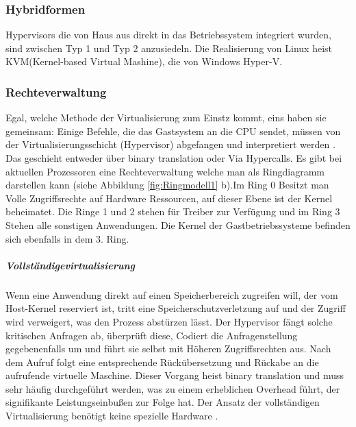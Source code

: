 \subsubsection{Hybridformen}


Hypervisors die von Haus aus direkt in das Betriebssystem integriert wurden, sind zwischen Typ 1 und Typ 2 anzusiedeln. Die Realisierung von Linux heist KVM(Kernel-based Virtual Mashine), die von Windows Hyper-V.

\subsubsection{Rechteverwaltung}
Egal, welche Methode der Virtualisierung zum Einstz kommt, eins haben sie gemeinsam: Einige Befehle, die das Gastsystem an die CPU sendet, müssen von der Virtualisierungsschicht (Hypervisor) abgefangen und interpretiert werden \cite{Meinel2011VirtualisierungMarktubersicht}. Das geschieht entweder über \glqq binary translation \grqq{} oder Via Hypercalls.  Es gibt bei aktuellen Prozessoren eine Rechteverwaltung welche man als Ringdiagramm darstellen kann (siehe Abbildung \ref{fig:Ringmodell1} b).Im Ring 0 Besitzt man Volle Zugriffsrechte auf Hardware Ressourcen, auf dieser Ebene ist der Kernel beheimatet. Die Ringe 1 und 2 stehen für Treiber zur Verfügung und im Ring 3 Stehen alle sonstigen Anwendungen. Die Kernel der Gastbetriebssysteme befinden sich ebenfalls in dem 3. Ring.

\subparagraph{Vollständigevirtualisierung}
 Wenn eine Anwendung direkt auf einen Speicherbereich zugreifen will, der vom Host-Kernel reserviert ist, tritt eine Speicherschutzverletzung auf und der Zugriff wird verweigert, was den Prozess abstürzen lässt. Der Hypervisor fängt solche kritischen Anfragen ab, überprüft diese, Codiert die Anfragenstellung gegebenenfalls um und führt sie selbst mit Höheren Zugriffsrechten aus. Nach dem Aufruf folgt eine entsprechende Rückübersetzung und Rückabe an die aufrufende virtuelle Maschine. Dieser Vorgang heist \glqq binary translation \grqq{} und muss sehr häufig durchgeführt werden, was zu einem erheblichen Overhead führt, der signifikante Leistungseinbußen zur Folge hat. Der Ansatz der vollständigen Virtualisierung benötigt keine spezielle Hardware \cite{Meinel2011VirtualisierungMarktubersicht}. 
 
